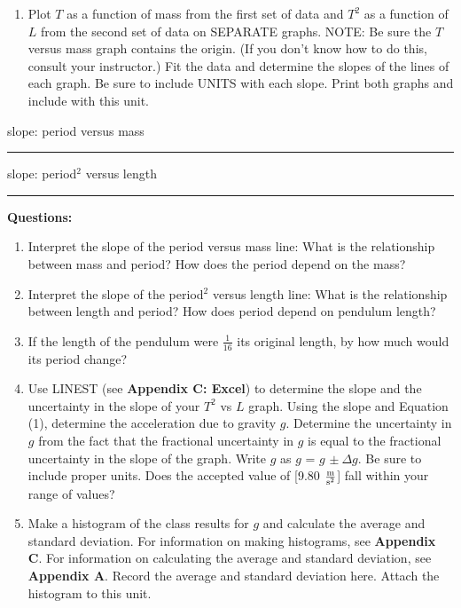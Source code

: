 \begin{enumerate}
\item Plot $T$ as a function of mass from the first set of data and $T^2$ as a function of $L$ from the second set of data on SEPARATE graphs. NOTE: Be sure the $T$ versus mass graph contains the origin. (If you don't know how to do this, consult your instructor.) Fit the data and determine the slopes of the lines of each graph. Be sure to include UNITS with each slope. Print both graphs and include with this unit.

\end{enumerate}

\vspace{10pt}

slope: period versus mass \rule{1.5in}{0.2pt}

\vspace{10pt}

slope: period$^2$ versus length \rule{1.5in}{0.2pt}

\vspace{10pt}

{\noindent \bf Questions:}

\begin{enumerate}
\item Interpret the slope of the period versus mass line: What is the relationship between mass and period? How does the period depend on the mass? 
\vspace{20mm}

\item Interpret the slope of the period$^2$ versus length line: What is the relationship between length and period? How does period depend on pendulum length? 
\vspace{20mm}

\item If the length of the pendulum were $\frac{1}{16}$ its original length, by how much would its period change? 
\vspace{20mm}

\item Use LINEST (see \textbf{Appendix C: Excel}) to determine the slope and the uncertainty in the slope of your $T^2$ vs $L$ graph. Using the slope and Equation (1), determine the acceleration due to gravity $g$. Determine the uncertainty in $g$ from the fact that the fractional uncertainty in $g$ is equal to the fractional uncertainty in the slope of the graph. Write $g$ as $g$ = $g$ \( \pm \ \Delta  g\). Be sure to include proper units. Does the accepted value of [9.80 $\frac{\rm m}{\rm s^2}$] fall within your range of values?
\vspace{30mm}

\item Make a histogram of the class results for $g$ and calculate the average and standard deviation. For information on making histograms, see \textbf{Appendix C}. For information on calculating the average and standard deviation, see \textbf{Appendix A}. Record the average and standard deviation here. Attach the histogram to this unit.
\end{enumerate}
